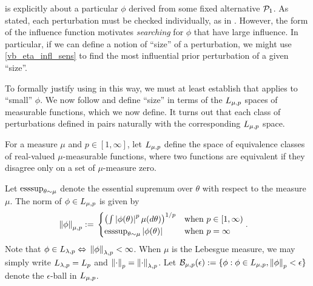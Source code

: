  is explicitly about a particular $\phi$ derived from
some fixed alternative $\mathcal{P}_{1}$.  As stated, each perturbation must be checked
individually, as in .  However, the form of the influence
function motivates {\em searching} for $\phi$ that have large influence. In
particular, if we can define a notion of ``size'' of a perturbation, we might
use \eqref{vb_eta_infl_sens} to find the most influential prior perturbation of
a given ``size''.


To formally justify using  in this way, we must at
least establish that  applies to ``small'' $\phi$. We
now follow \citet{gustafson:1996:local} and define ``size'' in terms of the
${L_{\mu, p}}$ spaces of measurable functions, which we now define.  It turns
out that each class of perturbations defined in 
pairs naturally with the corresponding ${L_{\mu,p}}$ space.


\begin{defn}
\citep[Sections 5.1-5.2]{dudley:2018:real}
%
For a measure $\mu$ and $p \in [1, \infty]$, let ${L_{\mu,p}}$ define the
space of equivalence classes of real-valued $\mu$-measurable functions,
where two functions are equivalent if they disagree only on a set of
$\mu$-measure zero.

Let $\operatorname*{\mathrm{esssup}}_{\theta\sim\mu}$ denote the essential supremum over $\theta$ with
respect to the measure $\mu$. The norm of $\phi \in {L_{\mu,p}}$ is given by
%
\begin{align*}
%
\norm{\phi}_{\mu,p} :={}&
\begin{cases}
    \left(\int \abs{\phi(\theta)}^p \mu(d\theta)\right)^{1/p}
    & \textrm{when }p \in [1, \infty)\\
    \esssup_{\theta\sim\mu} \abs{\phi(\theta)}
    & \textrm{when }p = \infty
\end{cases}.
%
\end{align*}
%
Note that $\phi \in {L_{\lambda,p}} \Leftrightarrow{} \left\Vert\phi\right\Vert_{\lambda,p} <
\infty$. When $\mu$ is the Lebesgue measure, we may simply write ${L_{\lambda,p}} =
{L_{p}}$ and $\left\Vert\cdot\right\Vert_{p} = \left\Vert\cdot\right\Vert_{\lambda,p}$.
%
Let $\mathcal{B}_{\mu,p}(\epsilon) := \{\phi: \phi \in {L_{\mu, p}},
\left\Vert\phi\right\Vert_p < \epsilon \}$ denote the $\epsilon$-ball in ${L_{\mu, p}}$.
%
\end{defn}

